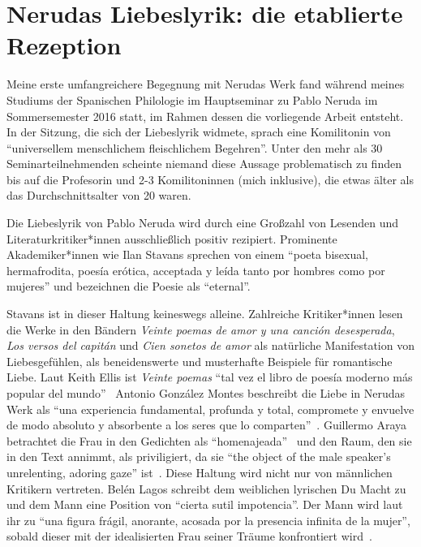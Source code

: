 \section{Nerudas Liebeslyrik: die etablierte Rezeption}

Meine erste umfangreichere Begegnung mit Nerudas Werk fand während meines Studiums der Spanischen Philologie im Hauptseminar zu Pablo Neruda im Sommersemester 2016 statt, im Rahmen dessen die vorliegende Arbeit entsteht.
In der Sitzung, die sich der Liebeslyrik widmete, sprach eine Komilitonin von ``universellem menschlichem fleischlichem Begehren''.
Unter den mehr als 30 Seminarteilnehmenden scheinte niemand diese Aussage problematisch zu finden bis auf die Profesorin und 2-3 Komilitoninnen (mich inklusive), die etwas älter als das Durchschnittsalter von 20 waren.

Die Liebeslyrik von Pablo Neruda wird durch eine Großzahl von Lesenden und Literaturkritiker*innen ausschließlich positiv rezipiert.
Prominente Akademiker*innen wie Ilan Stavans sprechen von einem ``poeta bisexual, hermafrodita, poesía erótica, acceptada y leída tanto por hombres como por mujeres''
und bezeichnen die Poesie als ``eternal''\cite{Stavans2014}.

Stavans ist in dieser Haltung keineswegs alleine.
Zahlreiche Kritiker*innen lesen die Werke in den Bändern \textit{Veinte poemas de amor y una canción desesperada}, \textit{Los versos del capitán} und \textit{Cien sonetos de amor} als natürliche Manifestation von Liebesgefühlen, als beneidenswerte und musterhafte Beispiele für romantische Liebe.
Laut Keith Ellis ist \textit{Veinte poemas} ``tal vez el libro de poesía moderno más popular del mundo''~\cite{Ellis1985}
Antonio González Montes beschreibt die Liebe in Nerudas Werk als ``una experiencia fundamental, profunda y total, compromete y envuelve de modo absoluto y absorbente a los seres que lo comparten''~\cite{Montes1985}.
Guillermo Araya betrachtet die Frau in den Gedichten als ``homenajeada''~\cite{Araya1982} und den Raum, den sie in den Text annimmt, als priviligiert, da sie ``the object of the male speaker's unrelenting, adoring gaze'' ist~\cite{Duncan1992}.
Diese Haltung wird nicht nur von männlichen Kritikern vertreten.
Belén Lagos schreibt dem weiblichen lyrischen Du Macht zu und dem Mann eine Position von ``cierta sutil impotencia''.
Der Mann wird laut ihr zu ``una figura frágil, anorante, acosada por la presencia infinita de la mujer'', sobald dieser mit der idealisierten Frau seiner Träume konfrontiert wird~\cite{Lagos1975}.

